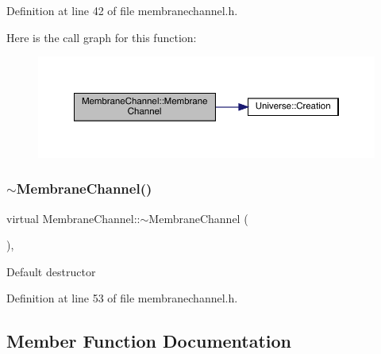 Definition at line 42 of file membranechannel.\+h.

Here is the call graph for this function\+:
\nopagebreak
\begin{figure}[H]
\begin{center}
\leavevmode
\includegraphics[width=350pt]{class_membrane_channel_ac467743cbdebcdc6a77ad5ea0527e6f0_cgraph}
\end{center}
\end{figure}
\mbox{\label{class_membrane_channel_a925e7e98530ef9cc94616ea7a4dd0cbd}} 
\subsubsection{\texorpdfstring{$\sim$\+Membrane\+Channel()}{~MembraneChannel()}}
{\footnotesize\ttfamily virtual Membrane\+Channel\+::$\sim$\+Membrane\+Channel (\begin{DoxyParamCaption}{ }\end{DoxyParamCaption})\hspace{0.3cm}{\ttfamily [inline]}, {\ttfamily [virtual]}}

Default destructor 

Definition at line 53 of file membranechannel.\+h.



\subsection{Member Function Documentation}
\mbox{\label{class_membrane_channel_ae483c6bc45f73390070b824296762d4c}} 
